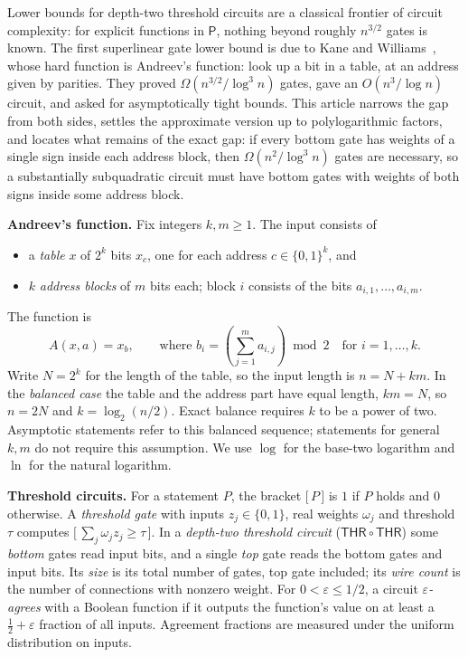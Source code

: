 \documentclass[11pt,letterpaper]{article}
\theoremstyle{remark}
\newcommand{\bits}{\{0,1\}}
\newcommand{\ind}[1]{\bigl[\,#1\,\bigr]}
\newcommand{\smalltitle}[1]{\textbf{\color{ink}#1}\quad}
\newcommand{\THR}{\mathsf{THR}}
\begin{document}
Lower bounds for depth-two threshold circuits are a classical frontier of
circuit complexity: for explicit functions in $\mathsf P$, nothing beyond
roughly $n^{3/2}$ gates is known. The first superlinear gate lower bound is
due to Kane and Williams~\cite{KW}, whose hard function is Andreev's function: look up a bit
in a table, at an address given by parities. They proved
$\Omega(n^{3/2}/\log^3n)$ gates, gave an $O(n^3/\log n)$ circuit, and asked for
asymptotically tight bounds. This article narrows the gap from both sides,
settles the approximate version up to polylogarithmic factors, and locates
what remains of the exact gap: if every bottom gate has weights of a single
sign inside each address block, then $\Omega(n^2/\log^3n)$ gates are
necessary, so a substantially subquadratic circuit must have bottom gates
with weights of both signs inside some address block.

\smalltitle{Andreev's function.}
Fix integers $k,m\ge1$. The input consists of
\begin{itemize}
\item a \emph{table} $x$ of $2^k$ bits $x_c$, one for each address
      $c\in\bits^k$, and
\item $k$ \emph{address blocks} of $m$ bits each; block $i$ consists of the bits
      $a_{i,1},\dots,a_{i,m}$.
\end{itemize}
The function is
\[
A(x,a)=x_b,\qquad\text{where }b_i=\left(\sum_{j=1}^m a_{i,j}\right)\bmod 2\quad\text{for }i=1,\dots,k.
\]
Write $N=2^k$ for the length of the table, so the input length is $n=N+km$.
In the \emph{balanced case} the table and the address part have equal
length, $km=N$, so $n=2N$ and $k=\log_2(n/2)$. Exact balance requires
$k$ to be a power of two. Asymptotic statements refer to this balanced
sequence; statements for general $k,m$ do not require this assumption.
We use $\log$ for the base-two logarithm and $\ln$ for the natural logarithm.

\smalltitle{Threshold circuits.}
For a statement $P$, the bracket $\ind{P}$ is $1$ if $P$ holds and $0$
otherwise. A \emph{threshold gate} with inputs $z_j\in\bits$, real weights
$\omega_j$ and threshold $\tau$ computes $\ind{\sum_j\omega_jz_j\ge\tau}$. In a \emph{depth-two threshold
circuit} ($\THR\circ\THR$) some \emph{bottom} gates read input bits, and a
single \emph{top} gate reads the bottom gates and input bits. Its
\emph{size} is its total number of gates, top gate included; its
\emph{wire count} is the number of connections with nonzero weight.
For $0<\varepsilon\le1/2$, a circuit \emph{$\varepsilon$-agrees} with a
Boolean function if it outputs the function's value on at least a
$\tfrac12+\varepsilon$ fraction of all inputs. Agreement fractions are
measured under the uniform distribution on inputs.
\end{document}
